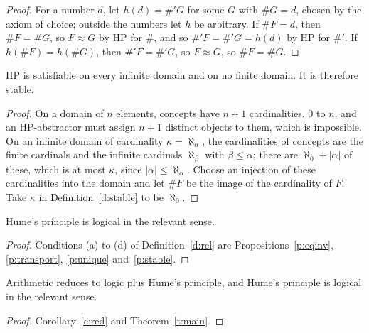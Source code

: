 \documentclass{situationist-preprint}
\begin{document}
\begin{proof}
For a number $d$, let $h(d) = \#'G$ for some $G$ with $\#G = d$, chosen by the axiom of choice; outside the numbers let $h$ be arbitrary. If $\#F = d$, then $\#F = \#G$, so $F \approx G$ by HP for $\#$, and so $\#' F = \#' G = h(d)$ by HP for $\#'$. If $h(\#F) = h(\#G)$, then $\#'F = \#'G$, so $F \approx G$, so $\#F = \#G$.
\end{proof}

\begin{proposition}[Stability]\label{p:stable}
HP is satisfiable on every infinite domain and on no finite domain. It is therefore stable.
\end{proposition}

\begin{proof}
On a domain of $n$ elements, concepts have $n + 1$ cardinalities, $0$ to $n$, and an HP-abstractor must assign $n + 1$ distinct objects to them, which is impossible. On an infinite domain of cardinality $\kappa = \aleph_\alpha$, the cardinalities of concepts are the finite cardinals and the infinite cardinals $\aleph_\beta$ with $\beta \leq \alpha$; there are $\aleph_0 + |\alpha|$ of these, which is at most $\kappa$, since $|\alpha| \leq \aleph_\alpha$. Choose an injection of these cardinalities into the domain and let $\#F$ be the image of the cardinality of $F$. Take $\kappa$ in Definition~\ref{d:stable} to be $\aleph_0$.
\end{proof}

\begin{theorem}\label{t:main}
Hume's principle is logical in the relevant sense.
\end{theorem}

\begin{proof}
Conditions (a) to (d) of Definition~\ref{d:rel} are Propositions~\ref{p:eqinv}, \ref{p:transport}, \ref{p:unique} and~\ref{p:stable}.
\end{proof}

\begin{corollary}\label{c:main}
Arithmetic reduces to logic plus Hume's principle, and Hume's principle is logical in the relevant sense.
\end{corollary}

\begin{proof}
Corollary~\ref{c:red} and Theorem~\ref{t:main}.
\end{proof}
\end{document}
